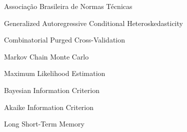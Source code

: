\imprimircapa
\imprimirfolhaderosto

\listoffigures*
\cleardoublepage

\listoftables*
\cleardoublepage

\begin{siglas}
  \item[ABNT] Associação Brasileira de Normas Técnicas
  \item[GARCH] Generalized Autoregressive Conditional Heteroskedasticity
  \item[CPCV] Combinatorial Purged Cross-Validation
  \item[MCMC] Markov Chain Monte Carlo
  \item[MLE] Maximum Likelihood Estimation
  \item[BIC] Bayesian Information Criterion
  \item[AIC] Akaike Information Criterion
  \item[LSTM] Long Short-Term Memory
\end{siglas}

\tableofcontents*
\cleardoublepage